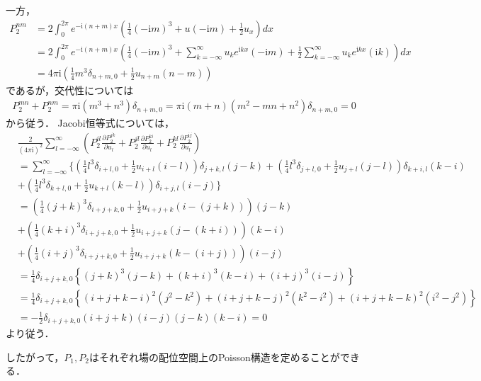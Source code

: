 \documentclass[dvipdfmx,12pt,a4paper,uplatex]{jsarticle}
\theoremstyle{plain}
\theoremstyle{definition}
\begin{document}
一方，
\begin{align}
P_2^{nm}
&=
2\int_0^{2\pi}
e^{-\mathrm i (n+m)x}
\left(\frac14 (-\mathrm i m)^3 
+ u (-\mathrm i m) + \frac12 u_x \right) 
dx \nonumber \\
&=
2
\int_0^{2\pi}
e^{-\mathrm i (n+m)x}
\left(\frac14 (-\mathrm i m)^3 
+ \sum_{k=-\infty}^\infty u_k e^{\mathrm i kx} (-\mathrm i m) 
+ \frac12\sum_{k=-\infty}^\infty u_k e^{\mathrm i kx} (\mathrm i k) \right) dx \nonumber \\
&=
4\pi\mathrm i
\left(\frac{1}{4}  m^3 \delta_{n+m,0}
+ \frac{1}{2} u_{n+m} (n-m)  \right)
\end{align}
であるが，交代性については
\begin{align}
P_2^{mn}+P^{nm}_2
=
\pi\mathrm i\left( m^3+n^3\right) \delta_{n+m,0}
=\pi \mathrm i (m+n)(m^2-mn+n^2) \delta_{n+m,0} = 0
\end{align}
から従う．
Jacobi恒等式については，
\begin{align}
&
\frac{2}{(4\pi\mathrm i)^2}
\sum_{l=-\infty}^\infty 
\left(
P_2^{il}\frac{\partial P_2^{jk}}{\partial u_l}
+
P_2^{jl}\frac{\partial P_2^{ki}}{\partial u_l}
+
P_2^{kl}\frac{\partial P_2^{ij}}{\partial u_l}
\right) \nonumber \\
&=
\sum_{l=-\infty}^\infty 
\Bigg\{
\left(\frac14  l^3 \delta_{i+l,0}
+ \frac12 u_{i+l}  (i-l)  \right)
\delta_{j+k,l}(j-k) +
\left(\frac14  l^3 \delta_{j+l,0}
+ \frac12 u_{j+l}  (j-l)  \right)
\delta_{k+i,l}(k-i) \nonumber \\
&+
\left(\frac14  l^3 \delta_{k+l,0}
+ \frac12 u_{k+l}  (k-l)  \right)
\delta_{i+j,l}(i-j)
\Bigg\} \nonumber \\
&=
\left(\frac14  (j+k)^3 \delta_{i+j+k,0}
+ \frac12 u_{i+j+k}  (i-(j+k))  \right)(j-k) \nonumber \\
&+
\left(\frac14  (k+i)^3 \delta_{i+j+k,0}
+ \frac12 u_{i+j+k}  (j-(k+i))  \right)(k-i) \nonumber \\
&+
\left(\frac14  (i+j)^3 \delta_{i+j+k,0}
+ \frac12 u_{i+j+k}  (k-(i+j))  \right)(i-j) \nonumber \\
&=
\frac14 \delta_{i+j+k,0}
\left\{(j+k)^3(j-k) + (k+i)^3(k-i) + (i+j)^3(i-j) \right\}
\nonumber \\
&=
\frac14 \delta_{i+j+k,0}
\left\{
  (i+j+k-i)^2(j^2-k^2) 
+ (i+j+k-j)^2(k^2-i^2)  
+ (i+j+k-k)^2(i^2-j^2)  \right\}
\nonumber \\
&=
-\frac12 \delta_{i+j+k,0}(i+j+k)
(i-j)(j-k)(k-i)
= 0
\end{align}
より従う．

したがって，$P_1,P_2$はそれぞれ場の配位空間上のPoisson構造を定めることができる．
\end{document}
